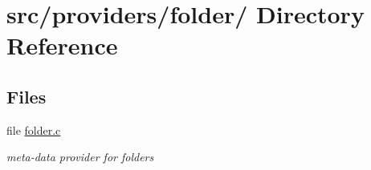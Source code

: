 \hypertarget{dir_000024}{
\section{src/providers/folder/ Directory Reference}
\label{dir_000024}
}
\subsection*{Files}
\begin{CompactItemize}
\item 
file \hyperlink{folder_8c}{folder.c}
\begin{CompactList}\small\item\em meta-data provider for folders \item\end{CompactList}

\end{CompactItemize}
